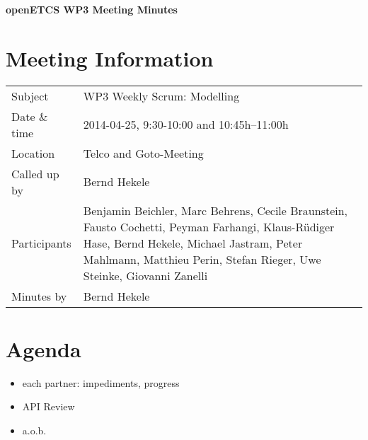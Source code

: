 \documentclass[a4paper, 11pt]{article}
\begin{document}
{\begin{center}\huge\bf openETCS WP3 Meeting Minutes\end{center}}
\section{Meeting Information}

\renewcommand{\arraystretch}{1.5}
\begin{supertabular}{m{.2\textwidth}m{.8\textwidth}}
Subject & WP3 Weekly Scrum: Modelling\\
Date \& time & 2014-04-25, 9:30-10:00 and 10:45h--11:00h\\
Location & Telco and Goto-Meeting\\
Called up by & Bernd Hekele\\
Participants &
Benjamin Beichler,
Marc Behrens,
Cecile Braunstein,
Fausto Cochetti,
Peyman Farhangi,
Klaus-R\"udiger Hase,
Bernd Hekele,
Michael Jastram,
Peter Mahlmann,
Matthieu Perin,
Stefan Rieger,
Uwe Steinke,
Giovanni Zanelli
\\

Minutes by & Bernd Hekele\\
\end{supertabular}
\renewcommand{\arraystretch}{1.0}


\section{{Agenda}}
\begin{itemize}
\item each partner: impediments, progress
\item API Review
\item a.o.b.

\end{itemize}
\end{document}
